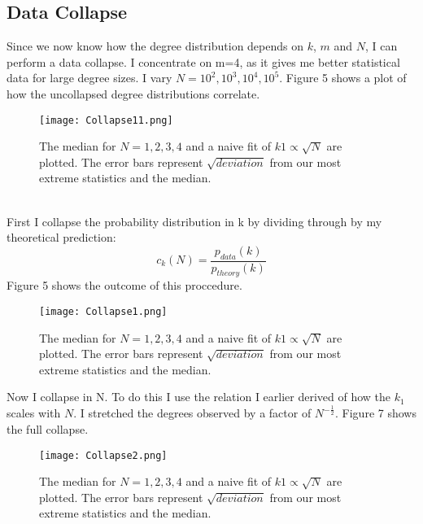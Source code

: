\documentclass[]{article}
\begin{document}
\subsection{Data Collapse}
Since we now know how the degree distribution depends on $k$, $m$ and $N$, I can perform a data collapse. I concentrate on m=4, as it gives me better statistical data for large degree sizes. I vary $N=10^2, 10^3, 10^4, 10^5$. Figure 5 shows a plot of how the uncollapsed degree distributions correlate. 
\begin{figure}[H]
	\centering
	
	\texttt{[image: Collapse11.png]}
	\caption{The median for $N=1,2,3,4$ and a naive fit of $k1 \propto \sqrt{N}$ are plotted. The error bars represent $\sqrt{deviation}$ from our most extreme statistics and the  median.}
\end{figure} 
\\ First I collapse the probability distribution in k by dividing through by my theoretical prediction:
\begin{equation}
	c_k(N)=\frac{p_{data}(k)}{p_{theory}(k)}
\end{equation}
Figure 5 shows the outcome of this proccedure.
\begin{figure}[H]
	\centering
	
	\texttt{[image: Collapse1.png]}
	\caption{The median for $N=1,2,3,4$ and a naive fit of $k1 \propto \sqrt{N}$ are plotted. The error bars represent $\sqrt{deviation}$ from our most extreme statistics and the  median.}
\end{figure}
Now I collapse in N. To do this I use the relation I earlier derived of how the $k_1$ scales with $N$. I stretched the degrees observed by a factor of $N^{-\frac{1}{2}}$. Figure 7 shows the full collapse.
\begin{figure}[H]
	\centering
	
	\texttt{[image: Collapse2.png]}
	\caption{The median for $N=1,2,3,4$ and a naive fit of $k1 \propto \sqrt{N}$ are plotted. The error bars represent $\sqrt{deviation}$ from our most extreme statistics and the  median.}
\end{figure}
\end{document}
